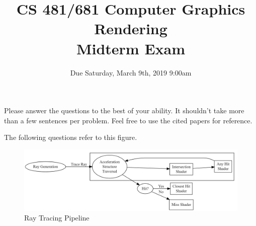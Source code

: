 \documentclass{exam}
\title{\bfseries \sffamily CS 481/681 Computer Graphics Rendering\\Midterm Exam}
\author{%
}
\date{Due Saturday, March 9th, 2019 9:00am}
\begin{document}
\maketitle

Please answer the questions to the best of your ability. It shouldn't take more than a few sentences per problem. Feel free to use the cited papers for reference.

The following questions refer to this figure.
\begin{figure}[h!]
\centering
\includegraphics[width=\textwidth]{ray-tracing-pipeline.png}
\caption{Ray Tracing Pipeline\label{fig:pipeline}}
\end{figure}
\end{document}
